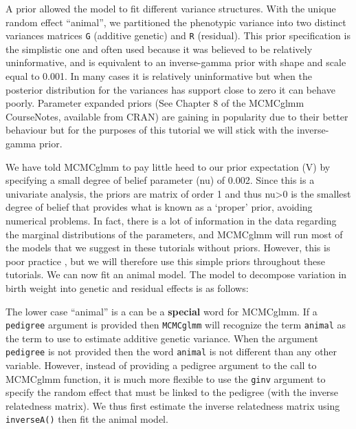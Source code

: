 \documentclass[
  12pt,
]{book}
\newenvironment{Shaded}{\begin{snugshade}}{\end{snugshade}}
\newcommand{\AttributeTok}[1]{\textcolor[rgb]{0.77,0.63,0.00}{#1}}
\newcommand{\DecValTok}[1]{\textcolor[rgb]{0.00,0.00,0.81}{#1}}
\newcommand{\FloatTok}[1]{\textcolor[rgb]{0.00,0.00,0.81}{#1}}
\newcommand{\FunctionTok}[1]{\textcolor[rgb]{0.00,0.00,0.00}{#1}}
\newcommand{\NormalTok}[1]{#1}
\newcommand{\OtherTok}[1]{\textcolor[rgb]{0.56,0.35,0.01}{#1}}
\newcommand{\SpecialCharTok}[1]{\textcolor[rgb]{0.00,0.00,0.00}{#1}}
\begin{document}
A prior allowed the model to fit different variance structures. With the unique random effect ``animal'', we partitioned the phenotypic variance into two distinct variances matrices \texttt{G} (additive genetic) and \texttt{R} (residual).
This prior specification is the simplistic one and often used because it was believed to be relatively uninformative, and is equivalent to an inverse-gamma prior with shape and scale equal to 0.001. In many cases it is relatively uninformative but when the posterior distribution for the variances has support close to zero it can behave poorly. Parameter expanded priors (See Chapter 8 of the MCMCglmm CourseNotes, available from CRAN) are gaining in popularity due to their better behaviour but for the purposes of this tutorial we will stick with the inverse-gamma prior.

We have told MCMCglmm to pay little heed to our prior expectation (V) by specifying a small degree of belief parameter (nu) of 0.002. Since this is a univariate analysis, the priors are matrix of order 1 and thus nu\textgreater0 is the smallest degree of belief that provides what is known as a `proper' prior, avoiding numerical problems. In fact, there is a lot of information in the data regarding the marginal distributions of the parameters, and MCMCglmm will run most of the models that we suggest in these tutorials without priors. However, this is poor practice , but we will therefore use this simple priors throughout these tutorials. We can now fit an animal model. The model to decompose variation in birth weight into genetic and residual effects is as follows:

The lower case ``animal'' is a can be a \textbf{special} word for MCMCglmm. If a \texttt{pedigree} argument is provided then \texttt{MCMCglmm} will recognize the term \texttt{animal} as the term to use to estimate additive genetic variance. When the argument \texttt{pedigree} is not provided then the word \texttt{animal} is not different than any other variable. However, instead of providing a pedigree argument to the call to MCMCglmm function, it is much more flexible to use the \texttt{ginv} argument to specify the random effect that must be linked to the pedigree (with the inverse relatedness matrix). We thus first estimate the inverse relatedness matrix using \texttt{inverseA()} then fit the animal model.

\begin{Shaded}
\end{Shaded}
\end{document}
